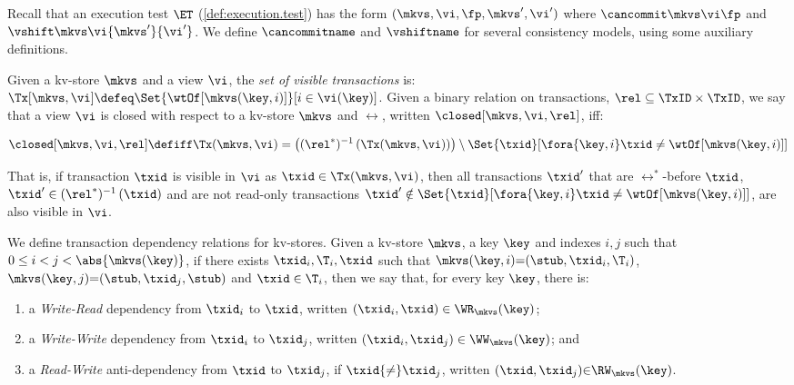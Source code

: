 Recall that an  execution test \(\ET\) (\cref{def:execution.test})
has the form \((\mkvs,\vi, \fp, \allowbreak \mkvs', \vi')\) 
where  \(\cancommit \mkvs \vi \fp\) and \(\vshift \mkvs \vi {\mkvs'} {\vi'}\). 
We define \(\cancommitname\) and \(\vshiftname\) for several consistency
models, using some auxiliary definitions. 


Given a kv-store \(\mkvs\) and a view \(\vi\), the {\em set of visible
transactions} is: 
\( \Tx[\mkvs, \vi]  \defeq \Set{\wtOf[\mkvs(\key, i)] }[ i \in \vi(\key)] \).
Given a binary relation on transactions, \(\rel \subseteq \TxID \times \TxID\), we say that a view \(\vi\) is closed with respect to a kv-store \(\mkvs\) and \(\rel\), written \(\closed[\mkvs,\vi,\rel]\), iff:  

\spaceshrink{-15pt}
{%
\displaymathfont
\begin{align*}
	\closed[\mkvs,\vi,\rel] \defiff
	\Tx(\mkvs, \vi) = 
	\left( (\rel^*)^{-1} \left( \Tx(\mkvs, \vi) \right) \right) \setminus \Set{\txid }[ \fora{\key,i} \txid \neq \wtOf[\mkvs(\key,i)] ]
\end{align*}
}%
\spaceshrink{-17pt}

\noindent
That is, if transaction \(\txid\) is visible in \(\vi\) as \( \txid \in \Tx(\mkvs, \vi) \),
then all transactions \( \txid'  \) that are \(\rel^*\)-before \(\txid\), \ie \(\txid' \in (\rel^*)^{-1} \left( \txid \right)\)
and are not read-only transactions \( \txid' \notin \Set{\txid }[ \fora{\key,i} \txid \neq \wtOf[\mkvs(\key,i)] ] \),
are also visible in \(\vi\).

We define transaction dependency relations for kv-stores.
Given a kv-store \(\mkvs\), a key \(\key\) and 
indexes \(i,j\) such that  \(0 \leq i < j < \abs{ \mkvs(\key) }\), 
if there exists \(\txid_i, \T_i, \txid\) such that 
\(\mkvs(\key, i)  {=} (\stub, \txid_{i}, \T_{i})\), \(\mkvs(\key,j) {=} (\stub, \txid_{j}, \stub)\)
and \(\txid \in \T_{i}\), 
then we say that, for every key \( \key \), there is:

\spaceshrink{-7pt}
\begin{enumerate} 
\item a \emph{Write-Read} dependency from \(\txid_{i}\) to \(\txid\), written \((\txid_{i},\txid) \in \WR_{\mkvs}(\key)\);
\item a \emph{Write-Write} dependency from \(\txid_{i}\) to \(\txid_{j}\), 
    written \((\txid_{i},\txid_{j}) \in \WW_{\mkvs}(\key) \); and 
\item a \emph{Read-Write} anti-dependency from \(\txid\) to \(\txid_{j}\), if 
\(\txid {\neq} \txid_{j}\), written \((\txid,\txid_j) {\in} \RW_{\mkvs}(\key)\).
\end{enumerate}
\spaceshrink{-7pt}

